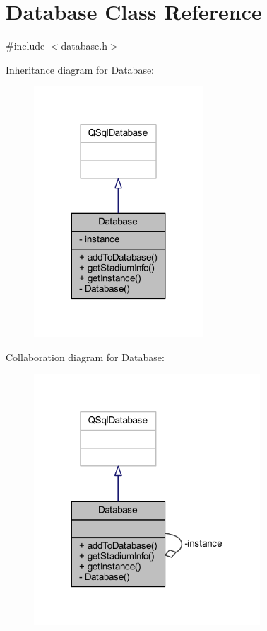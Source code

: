 \hypertarget{class_database}{}\section{Database Class Reference}
\label{class_database}


{\ttfamily \#include $<$database.\+h$>$}



Inheritance diagram for Database\+:\nopagebreak
\begin{figure}[H]
\begin{center}
\leavevmode
\includegraphics[width=179pt]{class_database__inherit__graph}
\end{center}
\end{figure}


Collaboration diagram for Database\+:\nopagebreak
\begin{figure}[H]
\begin{center}
\leavevmode
\includegraphics[width=240pt]{class_database__coll__graph}
\end{center}
\end{figure}

